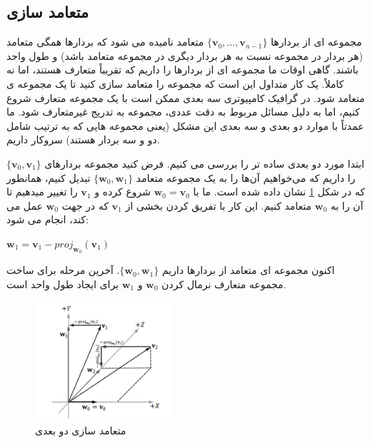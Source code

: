 \subsection{\textbf{متعامد سازی}}
\label{sec:1.3.1}
{
    \Large
    \begin{spacing}{1.5}
        مجموعه ای از بردارها $\{\textbf{v}_{0},...,\textbf{v}_{n-1}\}$ متعامد نامیده می شود که بردارها همگی متعامد (هر بردار در مجموعه نسبت به هر بردار دیگری در مجموعه متعامد باشد) و طول واحد باشند.
        گاهی اوقات ما مجموعه ای از بردارها را داریم که تقریباً متعارف هستند، اما نه کاملاً.
        یک کار متداول این است که مجموعه را متعامد سازی کنید تا یک مجموعه ی متعامد شود.
        در گرافیک کامپیوتری سه بعدی ممکن است با یک مجموعه متعارف شروع کنیم، اما به دلیل مسائل مربوط به دقت عددی، مجموعه به تدریج غیرمتعارف شود.
        ما عمدتاً با موارد دو بعدی و سه بعدی این مشکل (یعنی مجموعه هایی که به ترتیب شامل دو و سه بردار هستند) سروکار داریم.

        ابتدا مورد دو بعدی ساده تر را بررسی می کنیم.
        فرض کنید مجموعه بردارهای $\{\textbf{v}_{0},\textbf{v}_{1}\}$ را داریم که می‌خواهیم آن‌ها را به یک مجموعه متعامد $\{\textbf{w}_{0},\textbf{w}_{1}\}$ تبدیل کنیم،
        همانطور که در شکل \ref{fig:4.Session.1.1.11} نشان داده شده است.
        ما با $\textbf{w}_{0}=\textbf{v}_{0}$ شروع کرده و $\textbf{v}_{1}$ را تغییر میدهیم تا آن را به $\textbf{w}_{0}$ متعامد کنیم.
        این کار با تفریق کردن بخشی از $\textbf{v}_{1}$ که در جهت $\textbf{w}_{0}$  عمل می کند، انجام می شود:

        \begin{center}
            $\textbf{w}_{1}=\textbf{v}_{1}-proj_{\textbf{w}_{0}}(\textbf{v}_{1})$
        \end{center}

        اکنون مجموعه ای متعامد از بردارها داریم $\{\textbf{w}_{0},\textbf{w}_{1}\}$.
        آخرین مرحله برای ساخت مجموعه متعارف نرمال کردن $\textbf{w}_{0}$ و $\textbf{w}_{1}$ برای ایجاد طول واحد است.

        \begin{figure}[H]
            \centering
            \setlength{\belowcaptionskip}{-10pt}
            \includegraphics[width=0.45\textwidth]{Images/4/1/4.Session.1.1.11}
            \caption{متعامد سازی دو بعدی}
            \label{fig:4.Session.1.1.11}
        \end{figure}


\end{spacing}}
